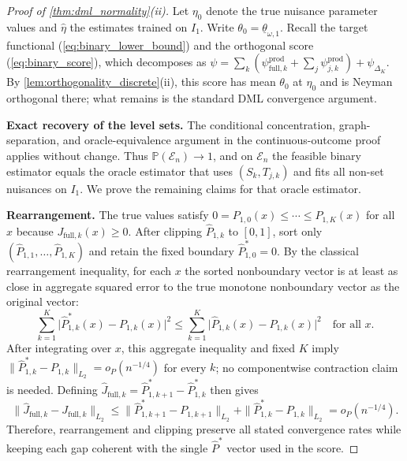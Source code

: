 \begin{proof}[Proof of \cref{thm:dml_normality}\textup{(ii)}]
Let $\eta_0$ denote the true nuisance parameter values and $\hat{\eta}$ the estimates trained on $I_1$. Write $\theta_0 = \underline{\theta}_{\omega,1}$. Recall the target functional (\ref{eq:binary_lower_bound}) and the orthogonal score (\ref{eq:binary_score}), which decomposes as $\psi = \sum_{k}(\psi_{\mathrm{full},k}^{\mathrm{prod}} + \sum_{j}\psi_{j,k}^{\mathrm{prod}}) + \psi_{\Delta_K}$. By \cref{lem:orthogonality_discrete}\textup{(ii)}, this score has mean $\theta_0$ at $\eta_0$ and is Neyman orthogonal there; what remains is the standard DML convergence argument.

\medskip
\noindent\textbf{Exact recovery of the level sets.}
The conditional concentration, graph-separation, and oracle-equivalence argument in the continuous-outcome proof applies without change. Thus $\mathbb P(\mathcal E_n)\to1$, and on $\mathcal E_n$ the feasible binary estimator equals the oracle estimator that uses $(S_k,T_{j,k})$ and fits all non-set nuisances on $I_1$. We prove the remaining claims for that oracle estimator.

\medskip
\noindent\textbf{Rearrangement.}
The true values satisfy $0=P_{1,0}(x) \leqslant \cdots \leqslant P_{1,K}(x)$ for all $x$ because $J_{\mathrm{full},k}(x) \geqslant 0$. After clipping $\hat P_{1,k}$ to $[0,1]$, sort only $(\hat P_{1,1},\ldots,\hat P_{1,K})$ and retain the fixed boundary $\hat P_{1,0}^*=0$. By the classical rearrangement inequality, for each $x$ the sorted nonboundary vector is at least as close in aggregate squared error to the true monotone nonboundary vector as the original vector:
\[
    \sum_{k=1}^{K} \bigl|\hat{P}_{1,k}^*(x) - P_{1,k}(x)\bigr|^2 \leqslant \sum_{k=1}^{K} \bigl|\hat{P}_{1,k}(x) - P_{1,k}(x)\bigr|^2 \quad \text{for all } x.
\]
After integrating over $x$, this aggregate inequality and fixed $K$ imply $\|\hat{P}_{1,k}^* - P_{1,k}\|_{L_2}=o_P(n^{-1/4})$ for every $k$; no componentwise contraction claim is needed. Defining $\hat J_{\mathrm{full},k}=\hat P_{1,k+1}^*-\hat P_{1,k}^*$ then gives
\[
\|\hat J_{\mathrm{full},k}-J_{\mathrm{full},k}\|_{L_2}
\leqslant \|\hat P^*_{1,k+1}-P_{1,k+1}\|_{L_2}+\|\hat P^*_{1,k}-P_{1,k}\|_{L_2}
=o_P(n^{-1/4}).
\]
Therefore, rearrangement and clipping preserve all stated convergence rates while keeping each gap coherent with the single $\hat P^*$ vector used in the score.


\end{proof}
